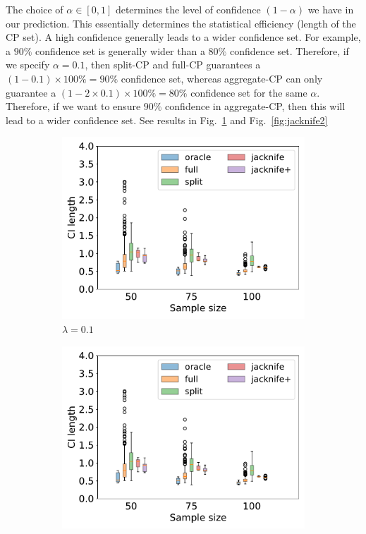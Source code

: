 \documentclass{article}
\begin{document}
The choice of $\alpha \in [0,1]$ determines the level of confidence $(1-\alpha)$ we have in our prediction. This essentially determines the statistical efficiency (length of the CP set). A high confidence generally leads to a wider confidence set. For example, a $90\%$ confidence set is generally wider than a $80\%$ confidence set. Therefore, if we specify $\alpha=0.1$, then split-CP and full-CP guarantees a $(1-0.1)\times 100\%=90\%$ confidence set, whereas aggregate-CP can only guarantee a $(1-2\times 0.1)\times 100\%=80\%$ confidence set for the same $\alpha$. Therefore, if we want to ensure $90\%$ confidence in aggregate-CP, then this will lead to a wider confidence set. See results in Fig.~\ref{fig:jacknife1} and Fig.~\ref{fig:jacknife2}\\ 

\begin{figure}[h!]
\begin{subfigure}{0.4\textwidth}
\centering
    \includegraphics[width=\textwidth]{figures/cpl_ord_5_lmd_0.1_n_tr_50_75_100_.pdf}
    \caption{$\lambda=0.1$}
    \label{fig:jacknife1}
\end{subfigure}
\hfill
\begin{subfigure}{0.4\textwidth}
\centering
    \includegraphics[width=\textwidth]{figures/cpl_ord_5_lmd_0.1_n_tr_50_75_100_.pdf}

\end{subfigure}
\end{figure}
\end{document}
